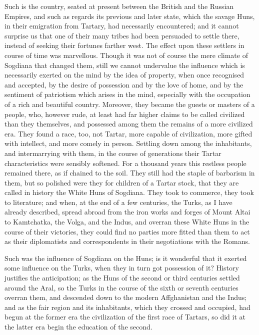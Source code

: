 Such is the country, seated at
present between the British and the Russian Empires, and such as
regards its previous and later state, which the savage Huns, in their
emigration from Tartary, had necessarily encountered; and it cannot
surprise us that one of their many tribes had been persuaded to settle
there, instead of seeking their fortunes farther west. The effect upon
these settlers in course of time was marvellous. Though it was not of
course the mere climate of Sogdiana that changed them, still we cannot
undervalue the influence which is necessarily exerted on the mind by
the idea of property, when once recognised and accepted, by the desire
of possession and by the love of home, and by the sentiment of
patriotism which arises in the mind, especially with the occupation of
a rich and beautiful country. Moreover, they became the guests or
masters of a people, who, however rude, at least had far higher claims
to be called civilized than they themselves, and possessed among them
the remains of a more civilized era. They found a race, too, not
Tartar, more capable of civilization, more gifted with intellect, and
more comely in person. Settling down among the inhabitants, and
intermarrying with them, in the course of generations their
Tartar characteristics were sensibly softened. For a thousand years
this restless people remained there, as if chained to the soil. They
still had the staple of barbarism in them, but so polished were they
for children of a Tartar stock, that they are called in history the
White Huns of Sogdiana. They took to commerce, they took to
literature; and when, at the end of a few centuries, the Turks, as I
have already described, spread abroad from the iron works and forges
of Mount Altai to Kamtchatka, the Volga, and the Indus, and overran
these White Huns in the course of their victories, they could find no
parties more fitted than them to act as their diplomatists and
correspondents in their negotiations with the Romans.

Such was the influence of
Sogdiana on the Huns; is it wonderful that it exerted some influence
on the Turks, when they in turn got possession of it? History
justifies the anticipation; as the Huns of the second or third
centuries settled around the Aral, so the Turks in the course of the
sixth or seventh centuries overran them, and descended down to the
modern Affghanistan and the Indus; and as the fair region and its
inhabitants, which they crossed and occupied, had begun at the former
era the civilization of the first race of Tartars, so did it at the
latter era begin the education of the second.

